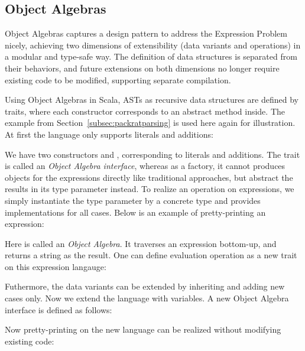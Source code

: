 \subsection{Object Algebras}\label{subsec:objectalgebras}
Object Algebras captures a design pattern to address the Expression Problem nicely, achieving two dimensions of extensibility (data variants and operations) in a modular and type-safe way. The definition of data structures is separated from their behaviors, and future extensions on both dimensions no longer require existing code to be modified, supporting separate compilation.

Using Object Algebras in Scala, ASTs as recursive data structures are defined by traits, where each constructor corresponds to an abstract method inside. The example from Section~\ref{subsec:packratparsing} is used here again for illustration.
At first the language only supports literals and additions:

We have two constructors  and , corresponding to literals and additions. The trait  is called an \textit{Object Algebra interface},
whereas as a factory, it cannot produces objects for the expressions directly like traditional approaches, but abstract the results in its
type parameter  instead. To realize an operation on expressions, we simply instantiate the type parameter by a concrete type and
provides implementations for all cases. Below is an example of pretty-printing an expression:

Here  is called an \textit{Object Algebra}. It traverses an expression bottom-up, and returns a string as the result.
One can define evaluation operation as a new trait on this expression langauge:


Futhermore, the data variants can be extended by inheriting  and adding new cases only. Now we extend the language
with variables. A new Object Algebra interface  is defined as follows:

Now pretty-printing on the new language can be realized without modifying existing code:

